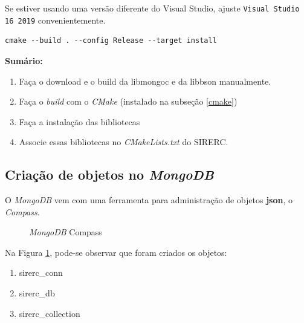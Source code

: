 \documentclass[a4paper,11pt]{article}
\newcommand{\sistema}{\textsf{SIRERC}}
\newcommand{\cmake}{\textit{CMake}}
\newcommand{\mongo}{\textit{MongoDB}}
\begin{document}
Se estiver usando uma versão diferente do Visual Studio, ajuste {\tt Visual Studio 16 2019} convenientemente.

\begin{verbatim}
cmake --build . --config Release --target install
\end{verbatim}



\textbf{Sumário:}
\begin{enumerate}
	\item Faça o download e o build  da libmongoc e da libbson manualmente.
	\item Faça o \textit{build} com o \cmake{} (instalado na subseção \ref{cmake})
	\item Faça a instalação das bibliotecas
	\item Associe essas bibliotecas no \textit{CMakeLists.txt} do \sistema{}.
\end{enumerate}

\subsection*{Criação de objetos no \mongo{}}

O \mongo{} vem com uma ferramenta para administração de objetos \textbf{json}, o \textit{Compass}.
\begin{figure}[H]
	\centering
	\caption{\mongo{} Compass}\label{fig:mongo_compass}
\end{figure}

Na Figura \ref{fig:mongo_compass}, pode-se observar que foram criados os objetos:
\begin{enumerate}
\item sirerc\_conn
\item sirerc\_db
\item sirerc\_collection
\end{enumerate}
\end{document}
